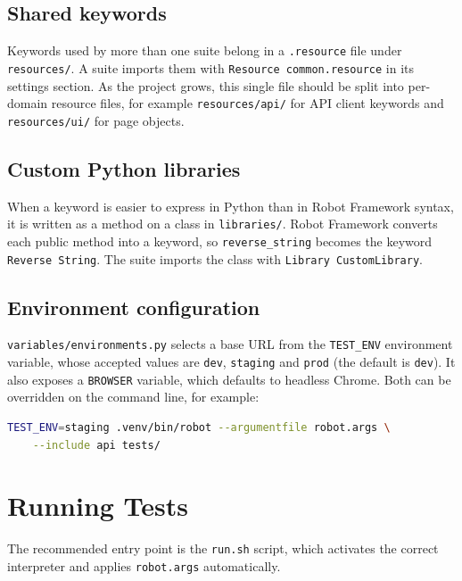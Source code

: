 \documentclass[a4paper,12pt]{article}
\newcommand{\code}[1]{\texttt{#1}}
\begin{document}
\subsection{Shared keywords}

Keywords used by more than one suite belong in a \code{.resource} file under
\code{resources/}. A suite imports them with \code{Resource common.resource} in
its settings section. As the project grows, this single file should be split
into per-domain resource files, for example \code{resources/api/} for API
client keywords and \code{resources/ui/} for page objects.

\subsection{Custom Python libraries}

When a keyword is easier to express in Python than in Robot Framework syntax, it
is written as a method on a class in \code{libraries/}. Robot Framework converts
each public method into a keyword, so \code{reverse\_string} becomes the keyword
\code{Reverse String}. The suite imports the class with
\code{Library CustomLibrary}.

\subsection{Environment configuration}

\code{variables/environments.py} selects a base URL from the \code{TEST\_ENV}
environment variable, whose accepted values are \code{dev}, \code{staging} and
\code{prod} (the default is \code{dev}). It also exposes a \code{BROWSER}
variable, which defaults to headless Chrome. Both can be overridden on the
command line, for example:

\begin{lstlisting}[language=bash]
TEST_ENV=staging .venv/bin/robot --argumentfile robot.args \
    --include api tests/
\end{lstlisting}

\section{Running Tests}
\label{sec:running}

The recommended entry point is the \code{run.sh} script, which activates the
correct interpreter and applies \code{robot.args} automatically.
\end{document}
